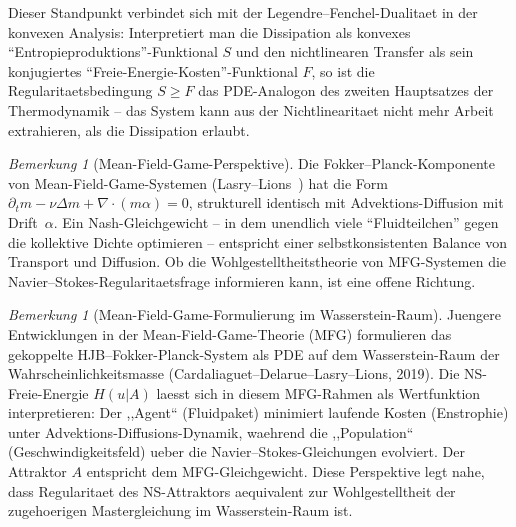 \documentclass[12pt,a4paper]{article}
\theoremstyle{definition}
\theoremstyle{plain}
\theoremstyle{remark}
\newtheorem{remark}[definition]{Bemerkung}
\begin{document}
Dieser Standpunkt verbindet sich mit der Legendre--Fenchel-Dualitaet in der konvexen Analysis: Interpretiert man die Dissipation als konvexes ``Entropieproduktions''-Funktional $S$ und den nichtlinearen Transfer als sein konjugiertes ``Freie-Energie-Kosten''-Funktional $F$, so ist die Regularitaetsbedingung $S \ge F$ das PDE-Analogon des zweiten Hauptsatzes der Thermodynamik -- das System kann aus der Nichtlinearitaet nicht mehr Arbeit extrahieren, als die Dissipation erlaubt.

\begin{remark}[Mean-Field-Game-Perspektive]
Die Fokker--Planck-Komponente von Mean-Field-Game-Systemen
(Lasry--Lions~\cite{LasryLions2007}) hat die Form
$\partial_t m - \nu\Delta m + \nabla\cdot(m\alpha) = 0$,
strukturell identisch mit Advektions-Diffusion mit Drift~$\alpha$.
Ein Nash-Gleichgewicht -- in dem unendlich viele ``Fluidteilchen'' gegen
die kollektive Dichte optimieren -- entspricht einer selbstkonsistenten
Balance von Transport und Diffusion. Ob die Wohlgestelltheitstheorie
von MFG-Systemen die Navier--Stokes-Regularitaetsfrage informieren kann,
ist eine offene Richtung.
\end{remark}

\begin{remark}[Mean-Field-Game-Formulierung im Wasserstein-Raum]
\label{rem:mfg-wasserstein}
Juengere Entwicklungen in der Mean-Field-Game-Theorie (MFG) formulieren das gekoppelte HJB--Fokker-Planck-System als PDE auf dem Wasserstein-Raum der Wahrscheinlichkeitsmasse (Cardaliaguet--Delarue--Lasry--Lions, 2019). Die NS-Freie-Energie $H(u|A)$ laesst sich in diesem MFG-Rahmen als Wertfunktion interpretieren: Der ,,Agent`` (Fluidpaket) minimiert laufende Kosten (Enstrophie) unter Advektions-Diffusions-Dynamik, waehrend die ,,Population`` (Geschwindigkeitsfeld) ueber die Navier--Stokes-Gleichungen evolviert. Der Attraktor $A$ entspricht dem MFG-Gleichgewicht. Diese Perspektive legt nahe, dass Regularitaet des NS-Attraktors aequivalent zur Wohlgestelltheit der zugehoerigen Mastergleichung im Wasserstein-Raum ist.
\end{remark}
\end{document}
